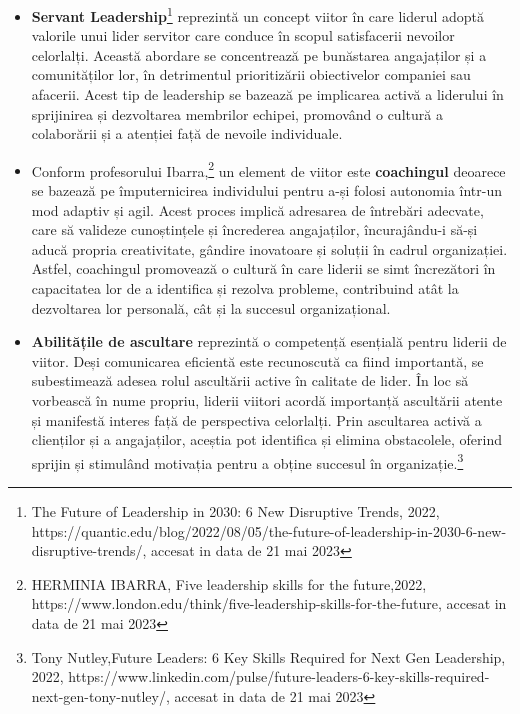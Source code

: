 \documentclass[a4paper, 12pt]{article}
\begin{document}
	\begin{itemize}
	\item \textbf{Servant Leadership}\footnote{The Future of Leadership in 2030: 6 New Disruptive Trends, 2022, https://quantic.edu/blog/2022/08/05/the-future-of-leadership-in-2030-6-new-disruptive-trends/, accesat in data de 21 mai 2023} reprezintă un concept viitor în care liderul adoptă valorile unui lider servitor care conduce în scopul satisfacerii nevoilor celorlalți. Această abordare se concentrează pe bunăstarea angajaților și a comunităților lor, în detrimentul prioritizării obiectivelor companiei sau afacerii. Acest tip de leadership se bazează pe implicarea activă a liderului în sprijinirea și dezvoltarea membrilor echipei, promovând o cultură a colaborării și a atenției față de nevoile individuale.



	\item Conform profesorului Ibarra,\footnote{HERMINIA IBARRA, Five leadership skills for the future,2022, https://www.london.edu/think/five-leadership-skills-for-the-future, accesat in data de 21 mai 2023}  un element de viitor este \textbf{coachingul} deoarece se bazează pe împuternicirea individului pentru a-și folosi autonomia într-un mod adaptiv și agil. Acest proces implică adresarea de întrebări adecvate, care să valideze cunoștințele și încrederea angajaților, încurajându-i să-și aducă propria creativitate, gândire inovatoare și soluții în cadrul organizației. Astfel, coachingul promovează o cultură în care liderii se simt încrezători în capacitatea lor de a identifica și rezolva probleme, contribuind atât la dezvoltarea lor personală, cât și la succesul organizațional.

\item \textbf{Abilitățile de ascultare} reprezintă o competență esențială pentru liderii de viitor. Deși comunicarea eficientă este recunoscută ca fiind importantă, se subestimează adesea rolul ascultării active în calitate de lider. În loc să vorbească în nume propriu, liderii viitori acordă importanță ascultării atente și manifestă interes față de perspectiva celorlalți. Prin ascultarea activă a clienților și a angajaților, aceștia pot identifica și elimina obstacolele, oferind sprijin și stimulând motivația pentru a obține succesul în organizație.\footnote{Tony Nutley,Future Leaders: 6 Key Skills Required for Next Gen Leadership, 2022, https://www.linkedin.com/pulse/future-leaders-6-key-skills-required-next-gen-tony-nutley/, accesat in data de 21 mai 2023} 

	\end{itemize}
\end{document}
